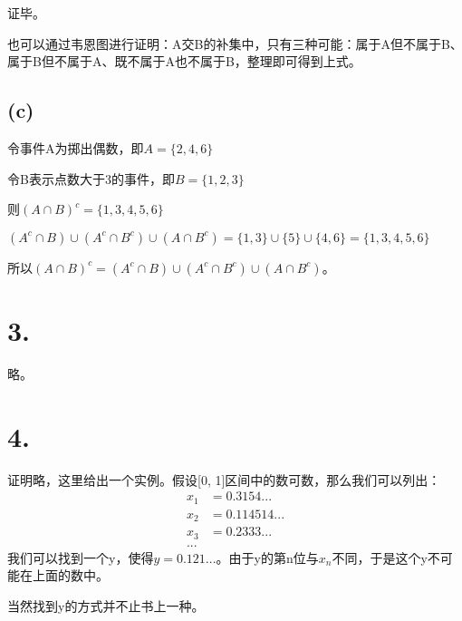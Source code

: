\documentclass[UTF8]{article}
\begin{document}
            证毕。

            也可以通过韦恩图进行证明：A交B的补集中，只有三种可能：属于A但不属于B、属于B但不属于A、既不属于A也不属于B，整理即可得到上式。
        
        \subsection*{(c)}
            令事件A为掷出偶数，即$A = \{2, 4, 6\}$
        
            令B表示点数大于3的事件，即$B = \{1, 2, 3\}$

            则$(A \cap B)^c = \{1, 3, 4, 5, 6\}$

            $(A^c \cap B) \cup  (A^c \cap B^c) \cup (A \cap B^c) = \{1, 3\} \cup \{5\} \cup \{4, 6\} = \{1, 3, 4, 5, 6\}$

            所以$(A \cap B)^c = (A^c \cap B) \cup  (A^c \cap B^c) \cup (A \cap B^c)$。
    \section*{3.}
        略。
    \section*{4.}
        证明略，这里给出一个实例。假设[0, 1]区间中的数可数，那么我们可以列出：
        $$\begin{array}{rcl}
            x_1 &= 0.3154... \\
            x_2 &= 0.114514... \\
            x_3 &= 0.2333... \\
            ...
        \end{array}$$
        我们可以找到一个y，使得$y = 0.121...$。由于y的第n位与$x_n$不同，于是这个y不可能在上面的数中。

        当然找到y的方式并不止书上一种。
\end{document}
